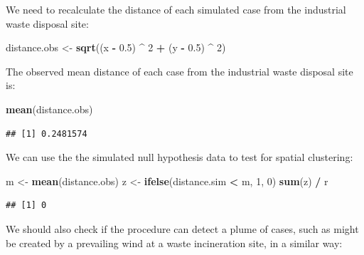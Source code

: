 \documentclass[12pt,a4paper]{book}
\newenvironment{Shaded}{\begin{snugshade}}{\end{snugshade}}
\newcommand{\KeywordTok}[1]{\textcolor[rgb]{0.13,0.29,0.53}{\textbf{#1}}}
\newcommand{\DecValTok}[1]{\textcolor[rgb]{0.00,0.00,0.81}{#1}}
\newcommand{\FloatTok}[1]{\textcolor[rgb]{0.00,0.00,0.81}{#1}}
\newcommand{\StringTok}[1]{\textcolor[rgb]{0.31,0.60,0.02}{#1}}
\newcommand{\OperatorTok}[1]{\textcolor[rgb]{0.81,0.36,0.00}{\textbf{#1}}}
\newcommand{\NormalTok}[1]{#1}
\theoremstyle{definition}
\theoremstyle{definition}
\theoremstyle{definition}
\theoremstyle{remark}
\begin{document}
We need to recalculate the distance of each simulated case from the
industrial waste disposal site:

\begin{Shaded}
\begin{Highlighting}[]
\NormalTok{distance.obs <-}\StringTok{ }\KeywordTok{sqrt}\NormalTok{((x }\OperatorTok{-}\StringTok{ }\FloatTok{0.5}\NormalTok{) }\OperatorTok{^}\StringTok{ }\DecValTok{2} \OperatorTok{+}\StringTok{ }\NormalTok{(y }\OperatorTok{-}\StringTok{ }\FloatTok{0.5}\NormalTok{) }\OperatorTok{^}\StringTok{ }\DecValTok{2}\NormalTok{)}
\end{Highlighting}
\end{Shaded}

The observed mean distance of each case from the industrial waste
disposal site is:

\begin{Shaded}
\begin{Highlighting}[]
\KeywordTok{mean}\NormalTok{(distance.obs)}
\end{Highlighting}
\end{Shaded}

\begin{verbatim}
## [1] 0.2481574
\end{verbatim}

We can use the the simulated null hypothesis data to test for spatial
clustering:

\begin{Shaded}
\begin{Highlighting}[]
\NormalTok{m <-}\StringTok{ }\KeywordTok{mean}\NormalTok{(distance.obs)}
\NormalTok{z <-}\StringTok{ }\KeywordTok{ifelse}\NormalTok{(distance.sim }\OperatorTok{<}\StringTok{ }\NormalTok{m, }\DecValTok{1}\NormalTok{, }\DecValTok{0}\NormalTok{)}
\KeywordTok{sum}\NormalTok{(z) }\OperatorTok{/}\StringTok{ }\NormalTok{r}
\end{Highlighting}
\end{Shaded}

\begin{verbatim}
## [1] 0
\end{verbatim}

We should also check if the procedure can detect a plume of cases, such
as might be created by a prevailing wind at a waste incineration site,
in a similar way:
\end{document}
